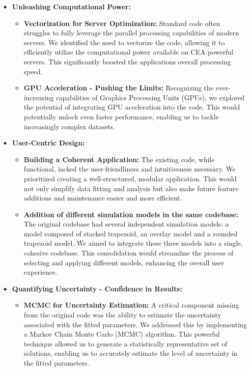 \begin{itemize}
    \item \textbf{Unleashing Computational Power:}
    \begin{itemize}
        \item \textbf{Vectorization for Server Optimization:} Standard code often struggles to fully leverage the parallel processing capabilities of modern servers. We identified the need to vectorize the code, allowing it to efficiently utilize the computational power available on CEA powerful servers. This significantly boosted the applications overall processing speed.
        \item \textbf{GPU Acceleration - Pushing the Limits:} Recognizing the ever-increasing capabilities of Graphics Processing Units (GPUs), we explored the potential of integrating GPU acceleration into the code. This would potentially unlock even faster performance, enabling us to tackle increasingly complex datasets.
    \end{itemize}
    \item \textbf{User-Centric Design:}
    \begin{itemize}
        \item \textbf{Building a Coherent Application:} The existing code, while functional, lacked the user-friendliness and intuitiveness necessary. We prioritized creating a well-structured, modular application. This would not only simplify data fitting and analysis but also make future feature additions and maintenance easier and more efficient.
        \item \textbf{Addition of different simulation models in the same codebase:} The original codebase had several independent simulation models: a model composed of stacked trapezoid, an overlay model and a rounded trapezoid model. We aimed to integrate these three models into a single, cohesive codebase. This consolidation would streamline the process of selecting and applying different models, enhancing the overall user experience.
      \end{itemize}
    \item \textbf{Quantifying Uncertainty - Confidence in Results:}
    \begin{itemize}
        \item \textbf{MCMC for Uncertainty Estimation:} A critical component missing from the original code was the ability to estimate the uncertainty associated with the fitted parameters. We addressed this by implementing a Markov Chain Monte Carlo (MCMC) algorithm. This powerful technique allowed us to generate a statistically representative set of solutions, enabling us to accurately estimate the level of uncertainty in the fitted parameters.

\end{itemize}
\end{itemize}
